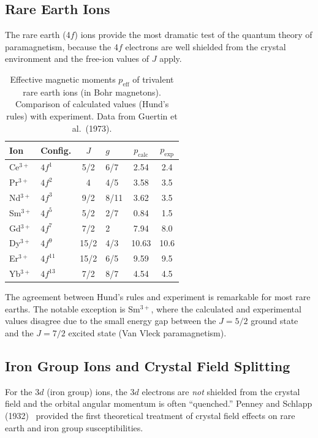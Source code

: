 \subsection{Rare Earth Ions}

The rare earth (4$f$) ions provide the most dramatic test of the quantum theory of paramagnetism, because the 4$f$ electrons are well shielded from the crystal environment and the free-ion values of $J$ apply.

\begin{table}[H]
\centering
\caption{Effective magnetic moments $p_{\text{eff}}$ of trivalent rare earth ions (in Bohr magnetons). Comparison of calculated values (Hund's rules) with experiment. Data from Guertin et al.\ (1973).}
\label{tab:rare_earth}
\begin{tabular}{@{}llSlSS@{}}
\toprule
Ion & Config. & {$J$} & $g$ & {$p_{\text{calc}}$} & {$p_{\text{exp}}$} \\
\midrule
Ce$^{3+}$ & $4f^1$  & 5/2 & 6/7  & 2.54 & 2.4 \\
Pr$^{3+}$ & $4f^2$  & 4   & 4/5  & 3.58 & 3.5 \\
Nd$^{3+}$ & $4f^3$  & 9/2 & 8/11 & 3.62 & 3.5 \\
Sm$^{3+}$ & $4f^5$  & 5/2 & 2/7  & 0.84 & 1.5 \\
Gd$^{3+}$ & $4f^7$  & 7/2 & 2    & 7.94 & 8.0 \\
Dy$^{3+}$ & $4f^9$  & 15/2 & 4/3 & 10.63 & 10.6 \\
Er$^{3+}$ & $4f^{11}$ & 15/2 & 6/5 & 9.59 & 9.5 \\
Yb$^{3+}$ & $4f^{13}$ & 7/2 & 8/7 & 4.54 & 4.5 \\
\bottomrule
\end{tabular}
\end{table}

The agreement between Hund's rules and experiment is remarkable for most rare earths. The notable exception is Sm$^{3+}$, where the calculated and experimental values disagree due to the small energy gap between the $J = 5/2$ ground state and the $J = 7/2$ excited state (Van Vleck paramagnetism).

\subsection{Iron Group Ions and Crystal Field Splitting}

For the 3$d$ (iron group) ions, the 3$d$ electrons are \textit{not} shielded from the crystal field and the orbital angular momentum is often ``quenched.'' Penney and Schlapp (1932)~\cite{penney1932crystal} provided the first theoretical treatment of crystal field effects on rare earth and iron group susceptibilities.

